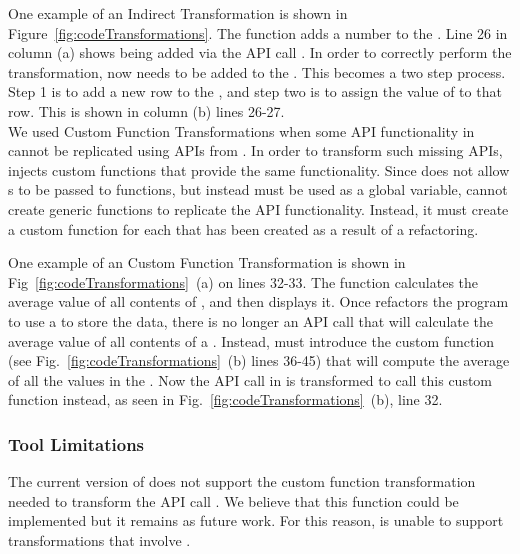 \documentclass{sigplanconf}
\begin{document}
One example of an Indirect Transformation is shown in Figure~\ref{fig:codeTransformations}. 
The function  adds a number to the  \NC{}. Line 26 in column (a) shows  being added via the API call .
In order to correctly perform the transformation,  now needs to be added to the  .
This becomes a two step process. Step 1 is to add a new row to the \CDT, and step two is to assign the value of  to that row. This is shown in column (b) lines 26-27. \\


We used Custom Function Transformations when some API functionality in \NC{} cannot be replicated using APIs from \CDT{}.
In order to transform such missing APIs, \tool injects custom functions that provide the same functionality.  
Since \TD does not allow \CDT{}s to be passed to functions, but instead must be used as a global variable, \tool cannot create generic functions to replicate the API functionality.  
Instead, it must create a custom function for each \CDT that has been created as a result of a refactoring.

One example of an Custom Function Transformation is shown in Fig~\ref{fig:codeTransformations}~(a) on lines 32-33.
The function  calculates the average value of all contents of , and then displays it. 
Once \tool refactors the program to use a \CDT to store the data, there is no longer an API call that will calculate the average value 
of all contents of a \CDT. Instead, \tool must introduce the custom function  (see Fig.~\ref{fig:codeTransformations}~(b) lines 36-45) that will compute the average of all the values in the .  
Now the API call in  is transformed to call this  custom function instead, as seen in Fig.~\ref{fig:codeTransformations}~(b), line 32.

\subsubsection{Tool Limitations}
The current version of \tool does not support the custom function transformation needed to transform the API call .  We believe that this function could be implemented but it remains as future work.  For this reason,  \tool is unable to support transformations that involve .
\end{document}

